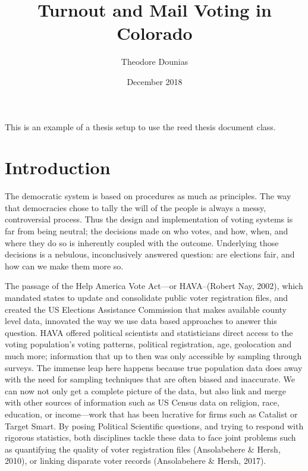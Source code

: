 \documentclass[12pt,twoside]{reedthesis}
\title{Turnout and Mail Voting in Colorado}
\author{Theodore Dounias}
\date{December 2018}
\begin{document}
      \maketitle
  
  \frontmatter %
  \pagestyle{empty} %

  
      \begin{preface}
      This is an example of a thesis setup to use the reed thesis document
      class.
    \end{preface}
  
      \hypersetup{linkcolor=black}
    \setcounter{tocdepth}{3}
    \tableofcontents
  
      \listoftables
  
      \listoffigures
  
  
  
  \mainmatter %
  \pagestyle{fancyplain} %

  \chapter*{Introduction}\label{introduction}
  
  The democratic system is based on procedures as much as principles. The
  way that democracies chose to tally the will of the people is always a
  messy, controversial process. Thus the design and implementation of
  voting systems is far from being neutral; the decisions made on who
  votes, and how, when, and where they do so is inherently coupled with
  the outcome. Underlying those decisions is a nebulous, inconclusively
  answered question: are elections fair, and how can we make them more so.
  
  The passage of the Help America Vote Act---or HAVA--(Robert Nay, 2002),
  which mandated states to update and consolidate public voter
  registration files, and created the US Elections Assistance Commission
  that makes available county level data, innovated the way we use data
  based approaches to answer this question. HAVA offered political
  scientists and statisticians direct access to the voting population's
  voting patterns, political registration, age, geolocation and much more;
  information that up to then was only accessible by sampling through
  surveys. The immense leap here happens because true population data does
  away with the need for sampling techniques that are often biased and
  inaccurate. We can now not only get a complete picture of the data, but
  also link and merge with other sources of information such as US Census
  data on religion, race, education, or income---work that has been
  lucrative for firms such as Catalist or Target Smart. By posing
  Political Scientific questions, and trying to respond with rigorous
  statistics, both disciplines tackle these data to face joint problems
  such as quantifying the quality of voter registration files
  (Ansolabehere \& Hersh, 2010), or linking disparate voter records
  (Ansolabehere \& Hersh, 2017).
  
\end{document}
